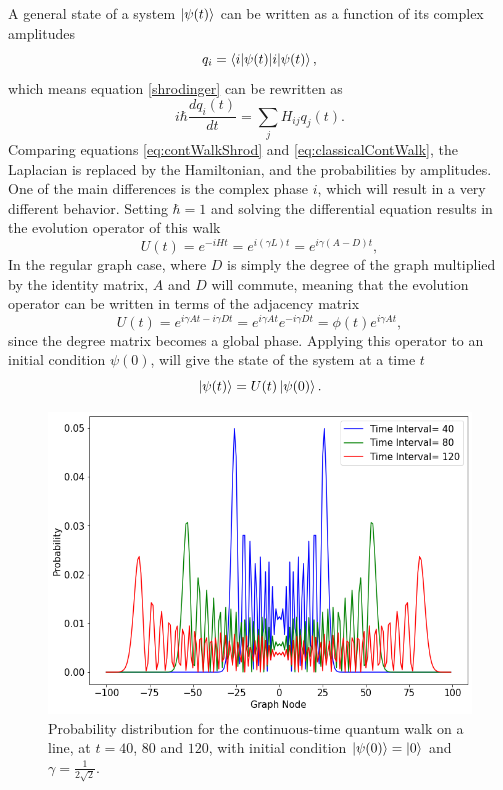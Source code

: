 \documentclass[../../dissertation.tex]{subfiles}
\begin{document}
A general state of a system $\ket{\psi(t)}$ can be written as a function of
its complex amplitudes 
\begin{equation}
	q_i = \braket{i|\psi(t)},
\end{equation}
which means equation \eqref{shrodinger} can be rewritten as 
\begin{equation}
	i\hbar \frac{dq_i(t)}{dt} = \sum_j H_{ij} q_j(t).
	\label{eq:contWalkShrod}
\end{equation}
Comparing equations \eqref{eq:contWalkShrod} and \eqref{eq:classicalContWalk},
the Laplacian is replaced by the Hamiltonian, and the probabilities by
amplitudes. One of the main differences is the complex phase $i$, which will
result in a very different behavior.  Setting $\hbar = 1$ and solving the
differential equation results in the evolution operator of this walk 
\begin{equation}
	U(t) = e^{-iHt} = e^{i(\gamma L)t} = e^{i\gamma(A-D)t},
\end{equation}
In the regular graph case, where $D$ is simply the degree of the graph
multiplied by the identity matrix, $A$ and $D$ will commute, meaning that the
evolution operator can be written in terms of the adjacency matrix 
\begin{equation}
	U(t) = e^{i\gamma A t - i\gamma D t} = e^{i\gamma A t} e^{-i\gamma D t} = \phi(t) e^{i\gamma A t},
	\label{eq:contSimulUniOp}
\end{equation}
since the degree matrix becomes a global phase.  Applying this operator to an
initial condition $\psi(0)$, will give the state of the system at a time $t$
\begin{equation}
	\ket{\psi(t)} = U(t)\ket{\psi(0)}.
\end{equation}\par
\begin{figure}[!h]
	\centering
	\includegraphics[scale=0.40]{img/ContQuantumWalk/ctqwMultipleTime.png}
	\caption{Probability distribution for the continuous-time quantum walk on a line, at $t=40$, $80$ and $120$, with initial condition $\ket{\psi(0)}=\ket{0}$ and $\gamma=\frac{1}{2\sqrt{2}}$.} 
	\label{fig:contdist0}
\end{figure}
\end{document}
